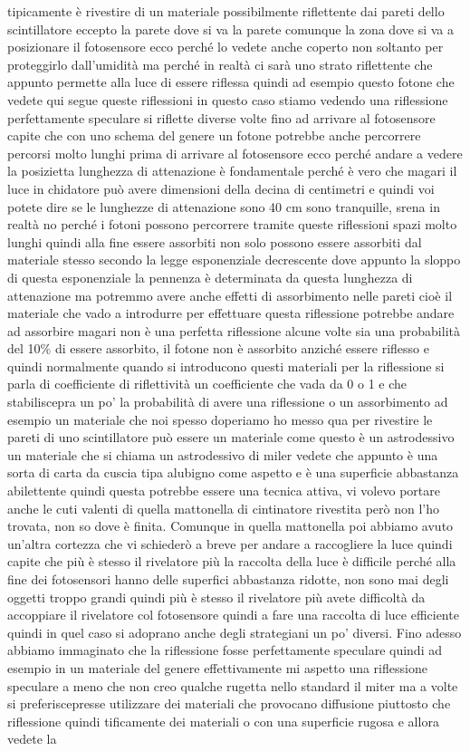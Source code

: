 tipicamente è rivestire di un materiale possibilmente riflettente dai pareti dello scintillatore eccepto la parete dove si va la parete comunque la zona dove si va a posizionare il fotosensore ecco perché lo vedete anche coperto non soltanto per proteggirlo dall'umidità ma perché in realtà ci sarà uno strato riflettente che appunto permette alla luce di essere riflessa quindi ad esempio questo fotone che vedete qui segue queste riflessioni in questo caso stiamo vedendo una riflessione perfettamente speculare si riflette diverse volte fino ad arrivare al fotosensore capite che con uno schema del genere un fotone potrebbe anche percorrere percorsi molto lunghi prima di arrivare al fotosensore ecco perché andare a vedere la posizietta lunghezza di attenazione è fondamentale perché è vero che magari il luce in chidatore può avere dimensioni della decina di centimetri e quindi voi potete dire se le lunghezze di attenazione sono 40 cm sono tranquille, srena in realtà no perché i fotoni possono percorrere tramite queste riflessioni spazi molto lunghi quindi alla fine essere assorbiti non solo possono essere assorbiti dal materiale stesso secondo la legge esponenziale decrescente dove appunto la sloppo di questa esponenziale la pennenza è determinata da questa lunghezza di attenazione ma potremmo avere anche effetti di assorbimento nelle pareti cioè il materiale che vado a introdurre per effettuare questa riflessione potrebbe andare ad assorbire magari non è una perfetta riflessione alcune volte sia una probabilità del 10\% di essere assorbito, il fotone non è assorbito anziché essere riflesso e quindi normalmente quando si introducono questi materiali per la riflessione si parla di coefficiente di riflettività un coefficiente che vada da 0 o 1 e che stabiliscepra un po' la probabilità di avere una riflessione o un assorbimento ad esempio un materiale che noi spesso doperiamo ho messo qua per rivestire le pareti di uno scintillatore può essere un materiale come questo è un astrodessivo un materiale che si chiama un astrodessivo di miler vedete che appunto è una sorta di carta da cuscia tipa alubigno come aspetto e è una superficie abbastanza abilettente quindi questa potrebbe essere una tecnica attiva, vi volevo portare anche le cuti valenti di quella mattonella di cintinatore rivestita però non l'ho trovata, non so dove è finita. Comunque in quella mattonella poi abbiamo avuto un'altra cortezza che vi schiederò a breve per andare a raccogliere la luce quindi capite che più è stesso il rivelatore più la raccolta della luce è difficile perché alla fine dei fotosensori hanno delle superfici abbastanza ridotte, non sono mai degli oggetti troppo grandi quindi più è stesso il rivelatore più avete difficoltà da accoppiare il rivelatore col fotosensore quindi a fare una raccolta di luce efficiente quindi in quel caso si adoprano anche degli strategiani un po' diversi. Fino adesso abbiamo immaginato che la riflessione fosse perfettamente speculare quindi ad esempio in un materiale del genere effettivamente mi aspetto una riflessione speculare a meno che non creo qualche rugetta nello standard il miter ma a volte si preferiscepresse utilizzare dei materiali che provocano diffusione piuttosto che riflessione quindi tificamente dei materiali o con una superficie rugosa e allora vedete la 